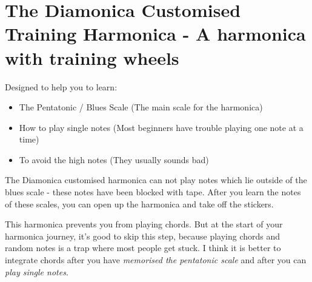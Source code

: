     \section{The Diamonica Customised Training Harmonica - A harmonica with training wheels}

    Designed to help you to learn:
    \begin{itemize}
        \item The Pentatonic / Blues Scale (The main scale for the harmonica)
        \item How to play single notes (Most beginners have trouble playing one note at a time)
        \item To avoid the high notes (They usually sounds bad)
    \end{itemize}

    The Diamonica customised harmonica can not play notes which lie outside of the blues scale - these notes have been blocked with tape. 
    After you learn the notes of these scales, you can open up the harmonica and take off the stickers.

    This harmonica prevents you from playing chords.
    But at the start of your harmonica journey, it's good to skip this step, because playing chords and random notes is a trap where most people get stuck.
    I think it is better to integrate chords after you have \textit{memorised the pentatonic scale} and after you can \textit{play single notes}.
    
        
        
        
        
